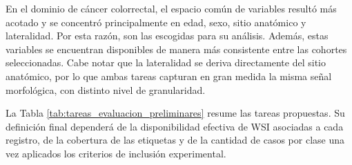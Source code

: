 En el dominio de cáncer colorrectal, el espacio común de variables resultó más acotado y se concentró principalmente en edad, sexo, sitio anatómico y lateralidad. Por esta razón, son las escogidas para su análisis. Además, estas variables se encuentran disponibles de manera más consistente entre las cohortes seleccionadas. Cabe notar que la lateralidad se deriva directamente del sitio anatómico, por lo que ambas tareas capturan en gran medida la misma señal morfológica, con distinto nivel de granularidad.

La Tabla \ref{tab:tareas_evaluacion_preliminares} resume las tareas propuestas. Su definición final dependerá de la disponibilidad efectiva de WSI asociadas a cada registro, de la cobertura de las etiquetas y de la cantidad de casos por clase una vez aplicados los criterios de inclusión experimental.

\begin{table}[htbp]
\centering
\caption{Tareas de evaluación definidas a partir de las variables armonizadas.}
\label{tab:tareas_evaluacion_preliminares}
\small
{}
\end{table}

